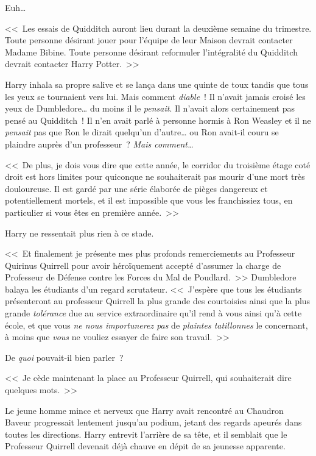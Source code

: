 Euh…

<<~Les essais de Quidditch auront lieu durant la deuxième semaine du trimestre. Toute personne désirant jouer pour l'équipe de leur Maison devrait contacter Madame Bibine. Toute personne désirant reformuler l'intégralité du Quidditch devrait contacter Harry Potter.~>>

Harry inhala sa propre salive et se lança dans une quinte de toux tandis que tous les yeux se tournaient vers lui. Mais comment \emph{diable}~! Il n'avait jamais croisé les yeux de Dumbledore… du moins il le \emph{pensait}. Il n'avait alors certainement pas pensé au Quidditch~! Il n'en avait parlé à personne hormis à Ron Weasley et il ne \emph{pensait} pas que Ron le dirait quelqu'un d'autre… ou Ron avait-il couru se plaindre auprès d'un professeur~? \emph{Mais comment…}

<<~De plus, je dois vous dire que cette année, le corridor du troisième étage coté droit est hors limites pour quiconque ne souhaiterait pas mourir d'une mort très douloureuse. Il est gardé par une série élaborée de pièges dangereux et potentiellement mortels, et il est impossible que vous les franchissiez tous, en particulier si vous êtes en première année.~>>

Harry ne ressentait plus rien à ce stade.

<<~Et finalement je présente mes plus profonds remerciements au Professeur Quirinus Quirrell pour avoir héroïquement accepté d'assumer la charge de Professeur de Défense contre les Forces du Mal de Poudlard.~>> Dumbledore balaya les étudiants d'un regard scrutateur. <<~J'espère que tous les étudiants présenteront au professeur Quirrell la plus grande des courtoisies ainsi que la plus grande \emph{tolérance} due au service extraordinaire qu'il rend à vous ainsi qu'à cette école, et que vous \emph{ne nous importunerez pas} de \emph{plaintes tatillonnes} le concernant, à moins que \emph{vous} ne vouliez essayer de faire son travail.~>>

De \emph{quoi} pouvait-il bien parler~?

<<~Je cède maintenant la place au Professeur Quirrell, qui souhaiterait dire quelques mots.~>>

Le jeune homme mince et nerveux que Harry avait rencontré au Chaudron Baveur progressait lentement jusqu'au podium, jetant des regards apeurés dans toutes les directions. Harry entrevit l'arrière de sa tête, et il semblait que le Professeur Quirrell devenait déjà chauve en dépit de sa jeunesse apparente.

